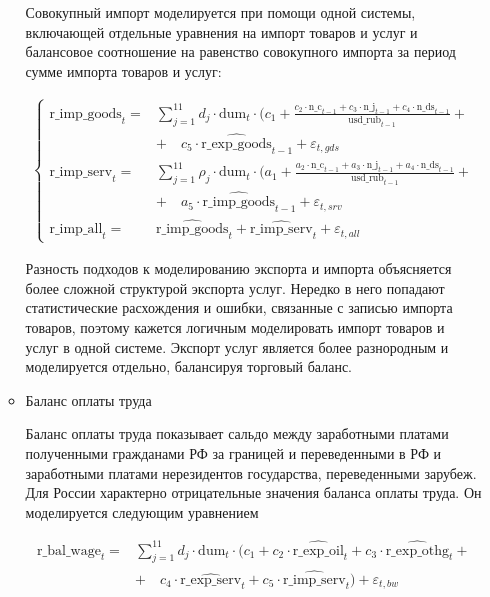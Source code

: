 \documentclass[a4paper, 14pt]{extarticle}
\newcommand{\lsum}{\sum\limits}
\renewcommand{\labelitemiii}{$\textcolor{violet}{\diamond}$}
\begin{document}
\begin{enumerate}
\begin{itemize}[label = \labelitemiii]
		Совокупный импорт моделируется при помощи одной системы, включающей отдельные уравнения на импорт товаров и услуг и балансовое соотношение на равенство совокупного импорта за период сумме импорта товаров и услуг:
		
		\begin{align*}
		\begin{cases}        
		\text{r\_imp\_goods}_t =& \lsum_{j = 1}^{11} d_j \cdot \text{dum}_t \cdot (c_1 +
		\frac{c_2\cdot\text{n\_c}_{t-1} +
			c_3\cdot\text{n\_j}_{t-1} +
				c_4\cdot\text{n\_ds}_{t-1}}{\text{usd\_rub}_{t-1}} + \\  
			& + \quad c_5 \cdot \widehat{\text{r\_exp\_goods}}_{t-1} + \varepsilon_{t, gds} \\
		\text{r\_imp\_serv}_t =& \lsum_{j = 1}^{11} \rho_j \cdot \text{dum}_t \cdot (a_1 +
		\frac{a_2 \cdot \text{n\_c}_{t-1} +
			a_3 \cdot \text{n\_j}_{t-1} +
			a_4  \cdot \text{n\_ds}_{t-1}}{\text{usd\_rub}_{t-1}} + \\  
		&+ \quad a_5 \cdot \widehat{\text{r\_imp\_goods}}_{t-1} + \varepsilon_{t, srv} \\
		\text{r\_imp\_all}_t =& \widehat{\text{r\_imp\_goods}}_t + \widehat{\text{r\_imp\_serv}}_t + \varepsilon_{t, all}
		\end{cases}
		\end{align*}
		
		Разность подходов к моделированию экспорта и импорта объясняется более сложной структурой экспорта услуг.
		Нередко в него попадают статистические расхождения и ошибки, связанные с записью импорта товаров, поэтому кажется логичным моделировать импорт товаров и услуг в одной системе.
		Экспорт услуг является более разнородным и моделируется отдельно, балансируя торговый баланс.
		\item Баланс оплаты труда
		
		Баланс оплаты труда показывает сальдо между заработными платами полученными гражданами РФ за границей и переведенными в РФ и заработными платами нерезидентов государства, переведенными зарубеж.
		Для России характерно отрицательные значения баланса оплаты труда.
		Он моделируется следующим уравнением
		
		\begin{align*}
			\text{r\_bal}\text{\_wage}_t =& \lsum_{j = 1}^{11} d_j \cdot \text{dum}_t \cdot (c_1 + 
			 c_2 \cdot \widehat{ \text{r\_exp\_oil}}_t + c_3 \cdot \widehat{ \text{r\_exp\_othg}}_t + \\
			 & + \quad c_4 \cdot \widehat{ \text{r\_exp\_serv}}_t + c_5 \cdot \widehat{ \text{r\_imp\_serv}}_t) + \varepsilon_{t, bw} 
		\end{align*}
		

\end{itemize}
\end{enumerate}
\end{document}
